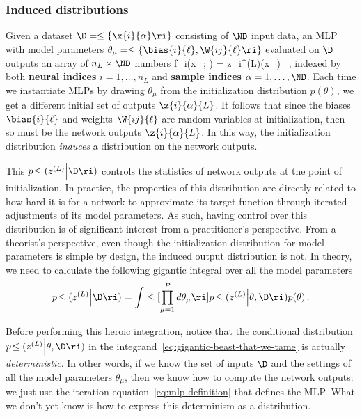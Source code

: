  



\subsubsection{Induced distributions}
%
Given a dataset $\D=\le\{\x{i}{\alpha}\ri\}$ consisting of $\ND$ input data, an MLP with model parameters $\theta_{\mu}=\le\{\bias{i}{\ell},\W{ij}{\ell}\ri\}$ 
evaluated on $\D$ 
outputs an array of $n_L\times \ND $ numbers
\be
f_i\!\le(x_{\alpha}; \theta\ri) = z_i^{(L)}(x_{\alpha})\equiv {} \, ,
\ee 
indexed by both \textbf{neural indices} $i=1,\ldots,n_L$ and \textbf{sample indices} $\alpha=1,\ldots,\ND$. 
Each time we instantiate MLPs by drawing  $\theta_{\mu}$ from the initialization distribution $p(\theta)$, we get a different initial set of outputs $\z{i}{\alpha}{L}$. 
It follows that since the biases $\bias{i}{\ell}$ and weights $\W{ij}{\ell}$ are random variables at initialization, then so must be the network outputs $\z{i}{\alpha}{L}$. 
In this way, the initialization distribution \emph{induces} a distribution on the network outputs.

This  $p\!\le(z^{(L)}\Big\vert \D\ri)$
controls the statistics of network outputs at the point of initialization. In practice, 
the properties of this distribution are directly related to how hard it is
for a network to approximate its target function through iterated adjustments of its model parameters. As such, having control over this distribution is of significant interest from a practitioner's perspective.
From a theorist's perspective, even though the initialization distribution for model parameters is simple by design, the induced output distribution is not.
In theory, we need to calculate the following gigantic integral over all the model parameters
\begin{align}\label{eq:gigantic-beast-that-we-tame}
p\!\le(z^{(L)} \Big| \D \ri) = \int \le[  \prod_{\mu=1}^{P} d \theta_{\mu}\ri]    p\!\le(z^{(L)} \Big|\theta, \D \ri) p(\theta)\, .
\end{align}

Before performing this heroic integration,
notice that the conditional distribution $p\!\le(z^{(L)} \Big|\theta, \D \ri)$ in the integrand~\eqref{eq:gigantic-beast-that-we-tame} is actually \emph{deterministic}. In other words, if we know the set of inputs $\D$ and the settings of all the model parameters $\theta_{\mu}$, then we know how to compute the network outputs: we just use the iteration equation~\eqref{eq:mlp-definition} that defines the MLP.
What we don't yet know
is how to express this determinism as a distribution. 
















